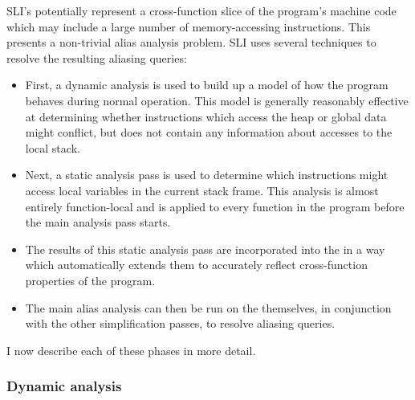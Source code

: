 
SLI's {\StateMachines} potentially represent a cross-function slice of
the program's machine code which may include a large number of
memory-accessing instructions.  This presents a non-trivial alias
analysis problem.  SLI uses several techniques to resolve the
resulting aliasing queries:

\begin{itemize}
\item
  First, a dynamic analysis is used to build up a model of how the
  program behaves during normal operation.  This model is generally
  reasonably effective at determining whether instructions which
  access the heap or global data might conflict, but does not contain
  any information about accesses to the local stack.
\item
  Next, a static analysis pass is used to determine which instructions
  might access local variables in the current stack frame.  This
  analysis is almost entirely function-local and is applied to every
  function in the program before the main analysis pass
  starts.


\item
  The results of this static analysis pass are incorporated into the
  {\StateMachines} in a way which automatically extends them to
  accurately reflect cross-function properties of the program.

\item
  The main alias analysis can then be run on the
  {\StateMachines} themselves, in conjunction with the other
  {\StateMachine} simplification passes, to resolve aliasing queries.
\end{itemize}

I now describe each of these phases in more detail.

\subsubsection{Dynamic analysis}


